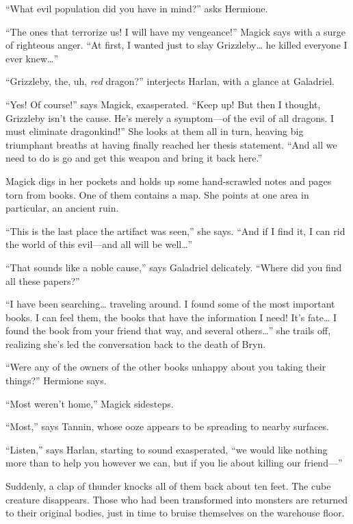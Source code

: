 \documentclass[smalldemyvopaper,11pt,twoside,onecolumn,openright,extrafontsizes]{memoir}
\begin{document}
``What evil population did you have in mind?'' asks Hermione.

``The ones that terrorize us! I will have my vengeance!'' Magick says
with a surge of righteous anger. ``At first, I wanted just to slay
Grizzleby\ldots{} he killed everyone I ever knew\ldots{}''

``Grizzleby, the, uh, \emph{red} dragon?'' interjects Harlan, with a
glance at Galadriel.

``Yes! Of course!'' says Magick, exasperated. ``Keep up! But then I
thought, Grizzleby isn't the cause. He's merely a symptom---of the evil
of all dragons. I must eliminate dragonkind!'' She looks at them all in
turn, heaving big triumphant breaths at having finally reached her
thesis statement. ``And all we need to do is go and get this weapon and
bring it back here.''

Magick digs in her pockets and holds up some hand-scrawled notes and
pages torn from books. One of them contains a map. She points at one
area in particular, an ancient ruin.

``This is the last place the artifact was seen,'' she says. ``And if I
find it, I can rid the world of this evil---and all will be
well\ldots{}''

``That sounds like a noble cause,'' says Galadriel delicately. ``Where
did you find all these papers?''

``I have been searching\ldots{} traveling around. I found some of the
most important books. I can feel them, the books that have the
information I need! It's fate\ldots{} I found the book from your friend
that way, and several others\ldots{}'' she trails off, realizing she's
led the conversation back to the death of Bryn.

``Were any of the owners of the other books unhappy about you taking
their things?'' Hermione says.

``Most weren't home,'' Magick sidesteps.

``Most,'' says Tannin, whose ooze appears to be spreading to nearby
surfaces.

``Listen,'' says Harlan, starting to sound exasperated, ``we would like
nothing more than to help you however we can, but if you lie about
killing our friend---''

Suddenly, a clap of thunder knocks all of them back about ten feet. The
cube creature disappears. Those who had been transformed into monsters
are returned to their original bodies, just in time to bruise themselves
on the warehouse floor.
\end{document}
